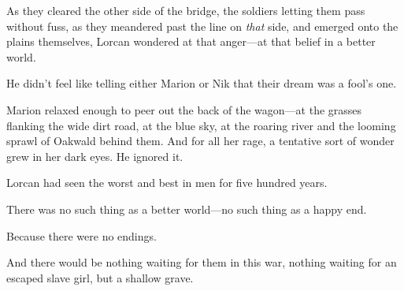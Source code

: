 As they cleared the other side of the bridge, the soldiers letting them pass without fuss, as they meandered past the line on \emph{that} side, and emerged onto the plains themselves, Lorcan wondered at that anger---at that belief in a better world.

He didn't feel like telling either Marion or Nik that their dream was a fool's one.

Marion relaxed enough to peer out the back of the wagon---at the grasses flanking the wide dirt road, at the blue sky, at the roaring river and the looming sprawl of Oakwald behind them.
And for all her rage, a tentative sort of wonder grew in her dark eyes.
He ignored it.

Lorcan had seen the worst and best in men for five hundred years.

There was no such thing as a better world---no such thing as a happy end.

Because there were no endings.

And there would be nothing waiting for them in this war, nothing waiting for an escaped slave girl, but a shallow grave.
